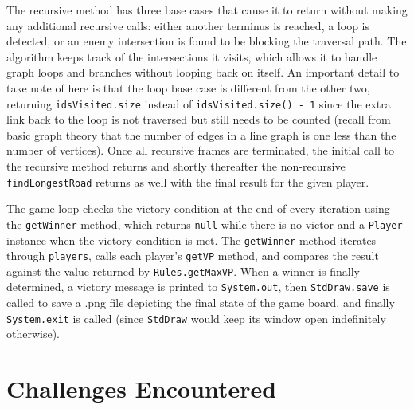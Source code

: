 \documentclass[pageno]{jpaper}
\begin{document}
\begin{doublespacing}
The recursive method has three base cases that cause it to return without making any additional recursive calls: either another terminus is reached, a loop is detected, or an enemy intersection is found to be blocking the traversal path. The algorithm keeps track of the intersections it visits, which allows it to handle graph loops and branches without looping back on itself. An important detail to take note of here is that the loop base case is different from the other two, returning \lstinline$idsVisited.size$ instead of \lstinline$idsVisited.size() - 1$ since the extra link back to the loop is not traversed but still needs to be counted (recall from basic graph theory that the number of edges in a line graph is one less than the number of vertices). Once all recursive frames are terminated, the initial call to the recursive method returns and shortly thereafter the non-recursive \lstinline$findLongestRoad$ returns as well with the final result for the given player.

The game loop checks the victory condition at the end of every iteration using the \lstinline$getWinner$ method, which returns \lstinline$null$ while there is no victor and a \lstinline$Player$ instance when the victory condition is met. The \lstinline$getWinner$ method iterates through \lstinline$players$, calls each player's \lstinline$getVP$ method, and compares the result against the value returned by \lstinline$Rules.getMaxVP$. When a winner is finally determined, a victory message is printed to \lstinline$System.out$, then \lstinline$StdDraw.save$ is called to save a .png file depicting the final state of the game board, and finally \lstinline$System.exit$ is called (since \lstinline$StdDraw$ would keep its window open indefinitely otherwise).

\hypertarget{sec:challenges_encountered}{}
\section{Challenges Encountered}


\end{doublespacing}
\end{document}
